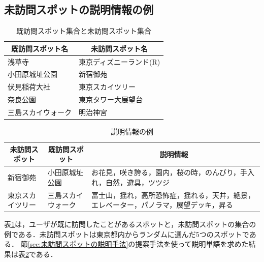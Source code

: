 \documentclass{deimj}
\begin{document}
\subsection{未訪問スポットの説明情報の例}
\label{subsec:未訪問スポットの説明情報の例}

\begin{table}[t]
  \caption{既訪問スポット集合と未訪問スポット集合}
  \label{table:既訪問スポット集合と未訪問スポット集合}
  \centering
  \begin{tabular}{l|l}
  \hline
  \multicolumn{1}{c|}{既訪問スポット名} & \multicolumn{1}{c}{未訪問スポット名} \\ \hline
  浅草寺                           & 東京ディズニーランド(R)                \\
  小田原城址公園                       & 新宿御苑                         \\
  伏見稲荷大社                        & 東京スカイツリー                     \\
  奈良公園                          & 東京タワー大展望台                    \\
  三島スカイウォーク                     & 明治神宮                         \\ \hline
  \end{tabular}
\end{table}

\begin{table}[t]
  \caption{説明情報の例}
  \label{table:説明情報の例}
  \centering
  \begin{tabular}{l|l|l}
  \hline
  \multicolumn{1}{c|}{未訪問スポット} & \multicolumn{1}{c|}{既訪問スポット} & \multicolumn{1}{c}{説明情報}                     \\ \hline
  新宿御苑                      & 小田原城址公園                         & お花見，咲き誇る，園内，桜の時，のんびり，手入れ，自然，遊具，ツツジ          \\
  東京スカイツリー                     & 三島スカイウォーク                    & 富士山，揺れ，高所恐怖症，揺れる，天井，絶景，エレベーター，パノラマ，展望デッキ，昇る \\ \hline
  \end{tabular}
\end{table}

表\ref{table:既訪問スポット集合と未訪問スポット集合}は，ユーザが既に訪問したことがあるスポットと，未訪問スポットの集合の例である．未訪問スポットは東京都内からランダムに選んだ5つのスポットである．
節\ref{sec:未訪問スポットの説明手法}の提案手法を使って説明単語を求めた結果は表\ref{table:説明情報の例}である．
\end{document}
